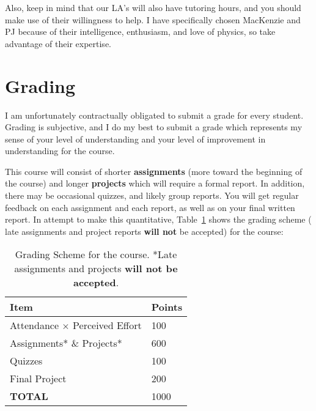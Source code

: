 \documentclass[justified]{tufte-handout}
\begin{document}
Also, keep in mind that our LA's will also have tutoring hours, and you should make use of their willingness to help. 
I have specifically chosen MacKenzie and PJ because of their intelligence, enthusiasm, and love of physics, so take advantage of their expertise. 

\section{Grading}
I am unfortunately contractually obligated to submit a grade for every student. Grading is subjective, and I do my best to submit a grade which represents my sense of your level of understanding and your level of improvement in understanding for the course. 

This course will consist of shorter \textbf{assignments} (more toward the beginning of the course) and longer \textbf{projects} which will require a formal report. In addition, there may be occasional quizzes, and likely group reports. You will get regular feedback on each assignment and each report, as well as on your final written report. In attempt to make this quantitative, Table~\ref{tab:normaltab} shows the grading scheme ( late assignments and project reports {\bfseries will not} be accepted) for the course: \\
\begin{table}[h]
  \centering
  \selectfont
  \begin{tabular}{ll}
    \toprule
    Item &  Points\\
    \midrule
    Attendance $\times$ Perceived Effort & 100 \\
    Assignments* \& Projects* &  600 \\
    Quizzes & 100\\
    Final Project & 200\\
    {\bf TOTAL} & 1000 \\
    \bottomrule
  \end{tabular}
  \caption{Grading Scheme for the course. *Late assignments and projects {\bf will not be accepted}.}
  \label{tab:normaltab}
\end{table}
\end{document}

